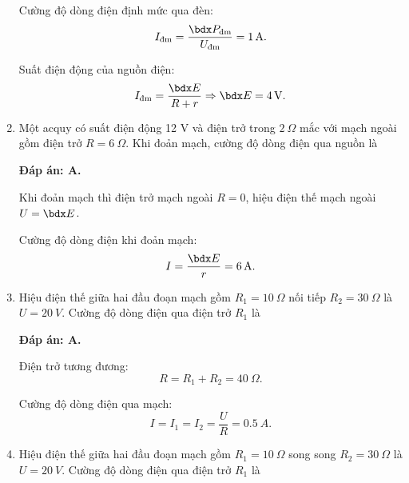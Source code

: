 \begin{enumerate}[label=\bfseries Câu \arabic*:]
{		Cường độ dòng điện định mức qua đèn:
		$$I_\text{đm} = \dfrac{\calP_\text{đm}}{U_\text{đm}} = \SI{1}{A}.$$
		
		Suất điện động của nguồn điện:
		$$I_\text{đm} = \dfrac{\calE}{R+r} \Rightarrow \calE = \SI{4}{V}.$$
	}
	\item {}
	
	\cauhoi
	{Một acquy có suất điện động 12 V và điện trở trong $\SI{2}{\Omega}$ mắc với mạch ngoài gồm điện trở $R=\SI{6}{\Omega}$. Khi đoản mạch, cường độ dòng điện qua nguồn là
		
	}
	\loigiai
	{	\textbf{Đáp án: A.}
		
		Khi đoản mạch thì điện trở mạch ngoài $R=0$, hiệu điện thế mạch ngoài $U=\calE$.
		
		Cường độ dòng điện khi đoản mạch:
		$$I=\dfrac{\calE}{r} = \SI{6}{A}.$$
	}
	\item {}
	
	\cauhoi
	{Hiệu điện thế giữa hai đầu đoạn mạch gồm $R_1=\SI{10}{\Omega}$ nối tiếp $R_2=\SI{30}{\Omega}$ là $U=\SI{20}{V}$. Cường độ dòng điện qua điện trở $R_1$ là
		
	}
	\loigiai
	{	\textbf{Đáp án: A.}
		
		Điện trở tương đương:
		$$R=R_1 + R_2 = \SI{40}{\Omega}.$$
		
		Cường độ dòng điện qua mạch:
		$$I= I_1 = I_2 = \dfrac{U}{R} = \SI{0.5}{A}.$$
	}
	\item {}
	
	\cauhoi
	{Hiệu điện thế giữa hai đầu đoạn mạch gồm $R_1=\SI{10}{\Omega}$ song song $R_2=\SI{30}{\Omega}$ là $U=\SI{20}{V}$. Cường độ dòng điện qua điện trở $R_1$ là
		
}
\end{enumerate}
